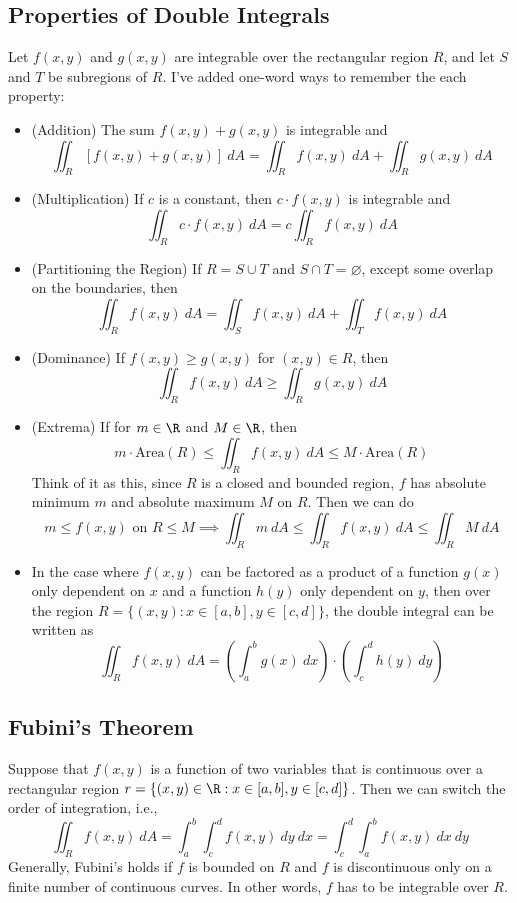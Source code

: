 \documentclass[]{mangos-musings}
\begin{document}
\subsection*{Properties of Double Integrals}
Let $f(x, y)$ and $g(x, y)$ are integrable over the rectangular region $R$, and let $S$ and $T$ be subregions of $R$. I've added one-word ways to remember the each property:
\begin{itemize}
  \item (Addition) The sum $f(x, y) + g(x, y)$ is integrable and 
  \[\iint_R \left[f(x,y) + g(x,y)\right] \ dA = \iint_R f(x,y) \ dA + \iint_R g(x,y) \ dA\] 
  \item (Multiplication) If $c$ is a constant, then $c\cdot f(x, y)$ is integrable and 
  \[\iint_R c\cdot f(x,y)\ dA = c\iint_R f(x,y)\ dA\] 
  \item (Partitioning the Region) If $R = S \cup T$ and $S \cap T = \varnothing$, except some overlap on the boundaries, then
  \[\iint_R f(x, y)\ dA = \iint_S f(x, y)\ dA + \iint_T f(x, y)\ dA\] 
  \item (Dominance) If $f(x, y) \ge g(x, y)$ for $(x, y)\in R$, then 
  \[\iint_R f(x, y)\ dA \ge \iint_R g(x, y)\ dA\] 
  \item (Extrema) If for $m\in \R$ and $M\in\R$, then 
  \[m\cdot \text{Area}(R) \le \iint_R f(x, y)\ dA \le M\cdot \text{Area}(R)\] 
  Think of it as this, since $R$ is a closed and bounded region, $f$ has absolute minimum $m$ and absolute maximum $M$ on $R$. Then we can do 
  \[m\le f(x, y)\text{ on }R \le M \implies \iint_R m\ dA \le \iint_R f(x, y)\ dA \le \iint_R M \ dA\]
  \item In the case where $f(x, y)$ can be factored as a product of a function $g(x)$ only dependent on $x$ and a function $h(y)$ only dependent on $y$, then over the region $R = \{(x, y) : x\in [a,b], y\in [c,d]\}$, the double integral can be written as 
  \[\iint_R f(x, y)\ dA = \left(\int_{a}^{b}g(x)\ dx\right)\cdot\left(\int_{c}^{d}h(y)\ dy\right)\]
\end{itemize}
\subsection*{Fubini's Theorem}
Suppose that $f(x, y)$ is a function of two variables that is continuous over a rectangular region $r = \{(x, y) \in \R : x\in [a, b], y\in[c,d]\}$. Then we can switch the order of integration, i.e.,
\[
  \iint_R f(x, y)\ dA 
  = \int_{a}^{b}\int_{c}^{d} f(x,y)\ dy \ dx 
  = \int_{c}^{d}\int_{a}^{b} f(x,y)\ dx \ dy
\]
Generally, Fubini's holds if $f$ is bounded on $R$ and $f$ is discontinuous only on a finite number of continuous curves. In other words, $f$ has to be integrable over $R$. 
\end{document}
